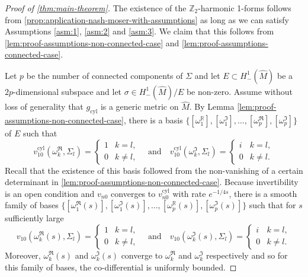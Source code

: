 \documentclass[preprint,12pt]{elsarticle}
\numberwithin{table}{section}
\newcommand{\Z}{\mathbb{Z}}
\newcommand{\R}{\mathbb{R}}
\begin{document}
\begin{proof}[Proof of \cref{thm:main-theorem}]
	The existence of the $\Z_2$-harmonic 1-forms follows from \cref{prop:application-nash-moser-with-assumptions} as long as we can satisfy Assumptions \ref{asm:1}, \ref{asm:2} and \ref{asm:3}. We claim that this follows from \cref{lem:proof-assumptions-non-connected-case} and \cref{lem:proof-assumptions-connected-case}.
	
	Let $p$ be the number of connected components of $\Sigma$ and let $E \subset H^1_-(\hat{M})$ be a $2p$-dimensional subspace and let $\sigma \in H^1_-(\hat M) / E$ be non-zero. Assume without loss of generality that $g_{\mathrm{cyl}}$ is a generic metric on $\hat{M}$. By Lemma \cref{lem:proof-assumptions-non-connected-case}, there is a basis $\{ [\omega_1^\R], [\omega_1^\Im], \ldots, [\omega_p^\Re], [\omega_p^\Im]\}$ of $E$ such that 
	$$
	v^{\mathrm{cyl}}_{10}(\omega_k^\Re, \Sigma_l) = \begin{cases}
		1 & k = l, \\
		0 & k \not= l,
	\end{cases}
	\quad \text{and} \quad
	v^{\mathrm{cyl}}_{10}(\omega_k^\Im, \Sigma_l) = \begin{cases}
		i & k = l, \\
		0 & k \not= l.
	\end{cases}
	$$
	Recall that the existence of this basis followed from the non-vanishing of a certain determinant in \cref{lem:proof-assumptions-non-connected-case}. Because invertibility is an open condition and $v_{n0}$ converges to $v^{\mathrm{cyl}}_{n0}$ with rate $e^{-1/4 s}$, there is a smooth family of bases $\{ [\omega_1^\Re(s)], [\omega_1^\Im(s)], \ldots, [\omega_p^\R(s)], [\omega_p^\Im(s)]\}$ such that for $s$ sufficiently large
	$$
	v_{10}(\omega_k^\Re(s), \Sigma_l) = \begin{cases}
		1 & k = l, \\
		0 & k \not= l,
	\end{cases}
	\quad \text{and} \quad
	v_{10}(\omega_k^\Im(s), \Sigma_l) = \begin{cases}
		i & k = l, \\
		0 & k \not= l.
	\end{cases}
	$$
	Moreover, $\omega_k^\Re(s)$ and $\omega_k^\Im(s)$ converge to $\omega_k^\Re$ and $\omega_k^\Im$ respectively and so for this family of bases, the co-differential is uniformly bounded.
	

\end{proof}
\end{document}
